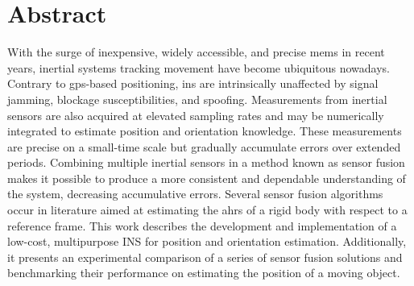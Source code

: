 \chapter*{Abstract}
\justify
With the surge of inexpensive, widely accessible, and precise \acrfull{mems} in recent years, inertial systems tracking movement have become ubiquitous nowadays. Contrary to \acrfull{gps}-based positioning,  \acrfull{ins} are intrinsically unaffected by signal jamming, blockage susceptibilities, and spoofing. Measurements from inertial sensors are also acquired at elevated sampling rates and may be numerically integrated to estimate position and orientation knowledge. These measurements are precise on a small-time scale but gradually accumulate errors over extended periods. Combining multiple inertial sensors in a method known as sensor fusion makes it possible to produce a more consistent and dependable understanding of the system, decreasing accumulative errors. Several sensor fusion algorithms occur in literature aimed at estimating the \acrfull{ahrs} of a rigid body with respect to a reference frame. This work describes the development and implementation of a low-cost, multipurpose INS for position and orientation estimation. Additionally, it presents an experimental comparison of a series of sensor fusion solutions and benchmarking their performance on estimating the position of a moving object.

